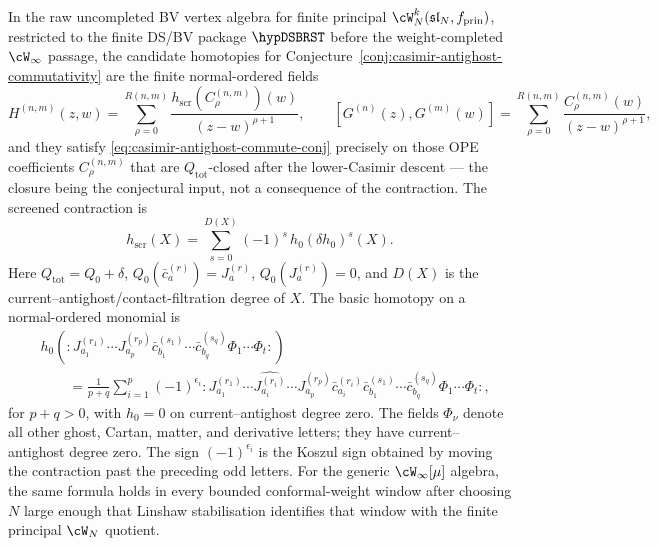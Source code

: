 \begin{proposition}
\label{prop:closed-normal-ordered-antighost-homotopies}
In the raw uncompleted BV vertex algebra for finite principal
$\cW_N^k(\mathfrak{sl}_N,f_{\mathrm{prin}})$, restricted to the
finite DS/BV package \(\hypDSBRST\) before the weight-completed
\(\cW_\infty\) passage, the candidate homotopies for
Conjecture~\ref{conj:casimir-antighost-commutativity} are the finite
normal-ordered fields
\begin{equation}\label{eq:closed-Hnm-formula}
H^{(n,m)}(z,w)
=
\sum_{\rho=0}^{R(n,m)}
\frac{h_{\mathrm{scr}}\!\left(C_\rho^{(n,m)}\right)(w)}
{(z-w)^{\rho+1}},
\qquad
[G^{(n)}(z),G^{(m)}(w)]
=
\sum_{\rho=0}^{R(n,m)}
\frac{C_\rho^{(n,m)}(w)}{(z-w)^{\rho+1}},
\end{equation}
and they satisfy
\eqref{eq:casimir-antighost-commute-conj} precisely on those OPE
coefficients $C_\rho^{(n,m)}$ that are $Q_{\mathrm{tot}}$-closed
after the lower-Casimir descent --- the closure being the
conjectural input, not a consequence of the contraction. The
screened contraction is
\begin{equation}\label{eq:screened-homotopy-closed-series}
h_{\mathrm{scr}}(X)
=
\sum_{s=0}^{D(X)}
(-1)^s\, h_0(\delta h_0)^s(X).
\end{equation}
Here $Q_{\mathrm{tot}}=Q_0+\delta$,
$Q_0(\bar c_a^{(r)})=J_a^{(r)}$, $Q_0(J_a^{(r)})=0$, and
$D(X)$ is the current--antighost/contact-filtration degree of $X$.
The basic homotopy on a normal-ordered monomial is
\begin{align}
&h_0\!\left(
{:}J_{a_1}^{(r_1)}\cdots J_{a_p}^{(r_p)}
\bar c_{b_1}^{(s_1)}\cdots \bar c_{b_q}^{(s_q)}
\Phi_1\cdots\Phi_t{:}\right) \label{eq:h0-normal-ordered}\\
&\qquad =
\frac{1}{p+q}
\sum_{i=1}^{p}(-1)^{\epsilon_i}
{:}J_{a_1}^{(r_1)}\cdots
\widehat{J_{a_i}^{(r_i)}}\cdots J_{a_p}^{(r_p)}
\bar c_{a_i}^{(r_i)}
\bar c_{b_1}^{(s_1)}\cdots \bar c_{b_q}^{(s_q)}
\Phi_1\cdots\Phi_t{:},
\nonumber
\end{align}
for $p+q>0$, with $h_0=0$ on current--antighost degree zero. The fields
$\Phi_\nu$ denote all other ghost, Cartan, matter, and derivative
letters; they have current--antighost degree zero. The sign
$(-1)^{\epsilon_i}$ is the Koszul sign obtained by moving the
contraction past the preceding odd letters. For the generic
$\cW_\infty[\mu]$ algebra, the same formula holds in every bounded
conformal-weight window after choosing $N$ large enough that Linshaw
stabilisation identifies that window with the finite principal
$\cW_N$ quotient.
\end{proposition}


